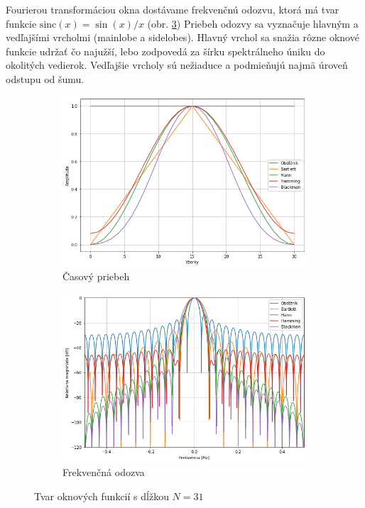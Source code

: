 Fourierou transformáciou okna dostávame frekvenčnú odozvu, ktorá má tvar funkcie $\mathrm{sinc}(x) = \sin(x) / x$
(obr. \ref{fig:window-freq}) Priebeh odozvy sa vyznačuje hlavným a vedľajšími vrcholmi (mainlobe a sidelobes).
Hlavný vrchol sa snažia rôzne oknové funkcie udržať čo najužší, lebo zodpovedá za šírku spektrálneho úniku do okolitých vedierok.
Vedľajšie vrcholy sú nežiaduce a podmieňujú najmä úroveň odstupu od šumu.

\begin{figure}[h]
\centering
\begin{subfigure}[b]{0.48\textwidth}
    \centering
    \includegraphics[width=\textwidth]{figures/analysis/window-time.png}
    \caption{Časový priebeh}
    \label{fig:window-time}
\end{subfigure}
\hfill
\begin{subfigure}[b]{0.48\textwidth}
    \centering
    \includegraphics[width=\textwidth]{figures/analysis/window-freq.png}
    \caption{Frekvenčná odozva}
    \label{fig:window-freq}
\end{subfigure}
\caption{Tvar oknových funkcií s dĺžkou $N = 31$}
\end{figure}

